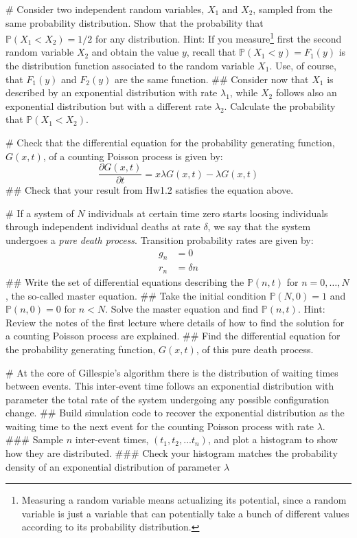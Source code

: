 \documentclass{article}
\newcommand{\Pb}{{\mathbb P}}
\begin{document}
\begin{easylist}[enumerate]

# Consider two independent random variables, $X_1$ and $X_2$, sampled from the same probability distribution. Show that the probability that $\Pb(X_1 < X_2) = 1/2$ for any distribution. Hint: If you measure\footnote{Measuring a random variable means actualizing its potential, since a random variable is just a variable that can potentially take a bunch of different values according to its probability distribution.} first the second random variable $X_2$ and obtain the value $y$, recall that $\Pb(X_1 < y) = F_1(y)$ is the distribution function associated to the random variable $X_1$. Use, of course, that $F_1(y)$ and $F_2(y)$ are the same function. 
## Consider now that $X_1$ is described by an exponential distribution with rate $\lambda_1$, while $X_2$ follows also an exponential distribution but with a different rate $\lambda_2$. Calculate the probability that $\Pb(X_1 < X_2)$.  

# Check that the differential equation for the probability generating function, $G(x,t)$, of a counting Poisson process is given by:
$$\frac{\partial G(x,t)}{\partial t} = x \lambda G(x,t) - \lambda G(x,t)$$
## Check that your result from Hw1.2 satisfies the equation above.

# If a system of $N$ individuals at certain time zero starts loosing individuals through independent individual deaths at rate $\delta$, we say that the system undergoes a {\em pure death process}. Transition probability rates are given by:
\begin{align*}
	g_n &=0 \\
    r_n &=\delta n
\end{align*}
## Write the set of differential equations describing the $\Pb(n,t)$ for $n=0, \dots, N$, the so-called master equation. 
## Take the initial condition $\Pb(N,0) = 1$ and $\Pb(n,0) = 0$ for $n<N$. Solve the master equation and find $\Pb(n,t)$. Hint: Review the notes of the first lecture where details of how to find the solution for a counting Poisson process are explained. 
## Find the differential equation for the probability generating function, $G(x,t)$, of this pure death process.

# At the core of Gillespie's algorithm there is the distribution of waiting times between events. This inter-event time follows an exponential distribution with parameter the total rate of the system undergoing any possible configuration change. 
## Build simulation code to recover the exponential distribution as the waiting time to the next event for the counting Poisson process with rate $\lambda$.
###  Sample $n$ inter-event times, $(t_1, t_2, ... t_n)$, and plot a histogram to show how they are distributed.
###  Check your histogram matches the probability density of an exponential distribution of parameter $\lambda$


\end{easylist}
\end{document}
